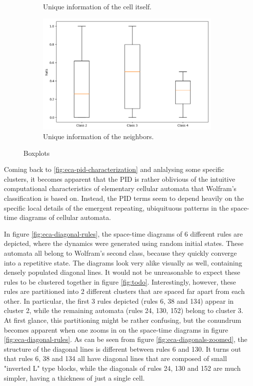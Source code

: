 \documentclass[12pt]{article}
\begin{document}
\begin{figure}
\begin{subfigure}{.5\textwidth}
  \caption{Unique information of the cell itself.}
  \label{fig:eca-box-ui-y}
\end{subfigure}
\begin{subfigure}{.5\textwidth}
  \centering
  \includegraphics[width=.9\linewidth]{eca-box-ui-z}
  \caption{Unique information of the neighbors.}
  \label{fig:eca-box-ui-z}
\end{subfigure}
\caption{Boxplots}
\label{fig:eca-boxplots}
\end{figure}

Coming back to \ref{fig:eca-pid-characterization} and anlalysing some specific clusters, it becomes apparent that the PID is rather oblivious of the intuitive computational characteristics of elementary cellular automata that Wolfram's classification is based on. Instead, the PID terms seem to depend heavily on the specific local details of the emergent repeating, ubiquituous patterns in the space-time diagrams of cellular automata. 

In figure \ref{fig:eca-diagonal-rules}, the space-time diagrams of 6 different rules are depicted, where the dynamics were generated using random initial states. These automata all belong to Wolfram's second class, because they quickly converge into a repetitive state. The diagrams look very alike visually as well, containing densely populated diagonal lines. It would not be unreasonable to expect these rules to be clustered together in figure \ref{fig:todo}. Interestingly, however, these rules are partitioned into 2 different clusters that are spaced far apart from each other. In particular, the first 3 rules depicted (rules 6, 38 and 134) appear in cluster 2, while the remaining automata (rules 24, 130, 152) belong to cluster 3. At first glance, this partitioning might be rather confusing, but the conundrum becomes apparent when one zooms in on the space-time diagrams in figure \ref{fig:eca-diagonal-rules}. As can be seen from figure \ref{fig:eca-diagonals-zoomed}, the structure of the diagonal lines is different between rules 6 and 130. It turns out that rules 6, 38 and 134 all have diagonal lines that are composed of small "inverted L" type blocks, while the diagonals of rules 24, 130 and 152 are much simpler, having a thickness of just a single cell. 
\end{document}
